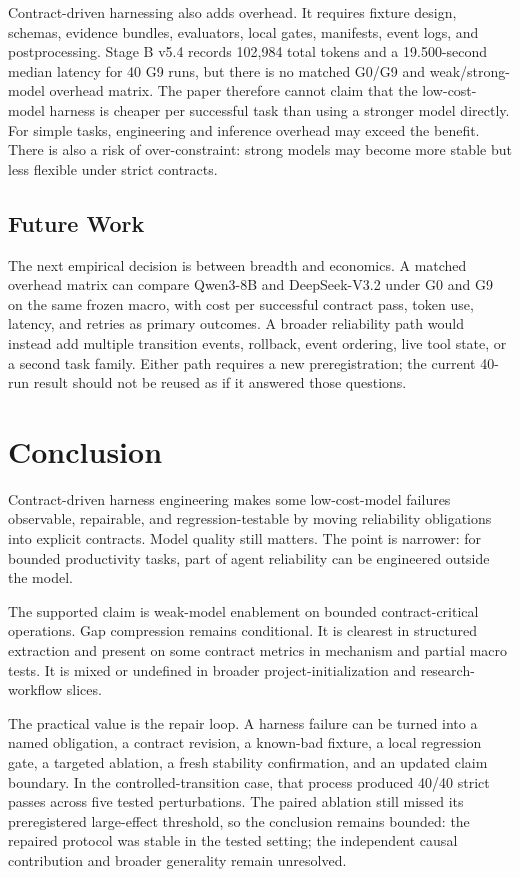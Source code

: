 \documentclass[11pt]{article}
\begin{document}
Contract-driven harnessing also adds overhead. It requires fixture design, schemas, evidence bundles, evaluators, local gates, manifests, event logs, and postprocessing. Stage B v5.4 records 102,984 total tokens and a 19.500-second median latency for 40 G9 runs, but there is no matched G0/G9 and weak/strong-model overhead matrix. The paper therefore cannot claim that the low-cost-model harness is cheaper per successful task than using a stronger model directly. For simple tasks, engineering and inference overhead may exceed the benefit. There is also a risk of over-constraint: strong models may become more stable but less flexible under strict contracts.

\subsection{Future Work}

The next empirical decision is between breadth and economics. A matched overhead matrix can compare Qwen3-8B and DeepSeek-V3.2 under G0 and G9 on the same frozen macro, with cost per successful contract pass, token use, latency, and retries as primary outcomes. A broader reliability path would instead add multiple transition events, rollback, event ordering, live tool state, or a second task family. Either path requires a new preregistration; the current 40-run result should not be reused as if it answered those questions.

\section{Conclusion}

Contract-driven harness engineering makes some low-cost-model failures observable, repairable, and regression-testable by moving reliability obligations into explicit contracts. Model quality still matters. The point is narrower: for bounded productivity tasks, part of agent reliability can be engineered outside the model.

The supported claim is weak-model enablement on bounded contract-critical operations. Gap compression remains conditional. It is clearest in structured extraction and present on some contract metrics in mechanism and partial macro tests. It is mixed or undefined in broader project-initialization and research-workflow slices.

The practical value is the repair loop. A harness failure can be turned into a named obligation, a contract revision, a known-bad fixture, a local regression gate, a targeted ablation, a fresh stability confirmation, and an updated claim boundary. In the controlled-transition case, that process produced 40/40 strict passes across five tested perturbations. The paired ablation still missed its preregistered large-effect threshold, so the conclusion remains bounded: the repaired protocol was stable in the tested setting; the independent causal contribution and broader generality remain unresolved.
\end{document}
